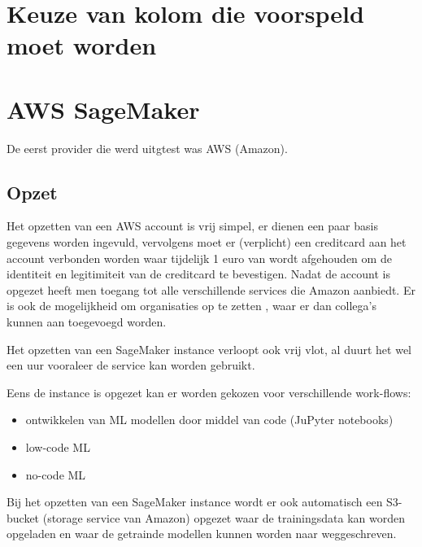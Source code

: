 \section{Keuze van kolom die voorspeld moet worden}



\section{AWS SageMaker}
De eerst provider die werd uitgtest was AWS (Amazon). 
\subsection{Opzet}
Het opzetten van een AWS account is vrij simpel, er dienen een paar basis gegevens worden ingevuld, vervolgens moet er (verplicht) een creditcard aan het account verbonden worden waar tijdelijk 1 euro van wordt afgehouden om de identiteit en legitimiteit van de creditcard te bevestigen. Nadat de account is opgezet heeft men toegang tot alle verschillende services die Amazon aanbiedt. Er is ook de mogelijkheid om organisaties op te zetten , waar er dan collega's kunnen aan toegevoegd worden.

Het opzetten van een SageMaker instance verloopt ook vrij vlot, al duurt het wel een uur vooraleer de service kan worden gebruikt. 

Eens de instance is opgezet kan er worden gekozen voor verschillende work-flows: 
\begin{itemize}
    \item ontwikkelen van ML modellen door middel van code (JuPyter notebooks)
    \item low-code ML
    \item no-code ML
\end{itemize}

Bij het opzetten van een SageMaker instance wordt er ook automatisch een S3-bucket (storage service van Amazon) opgezet waar de trainingsdata kan worden opgeladen en waar de getrainde modellen kunnen worden naar weggeschreven. 

